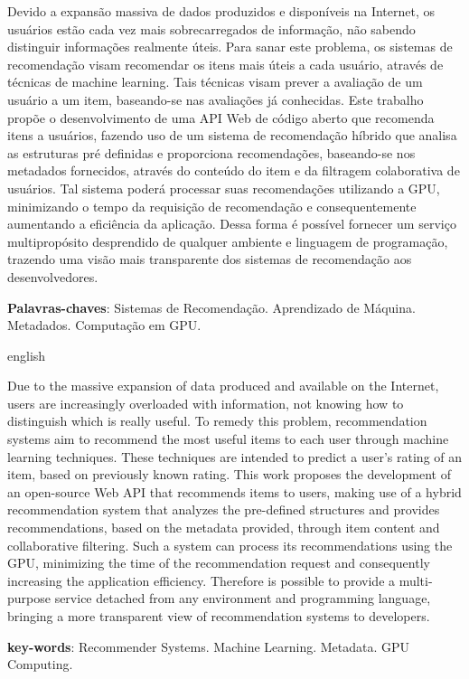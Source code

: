 \documentclass[12pt, openright, oneside, a4paper, brazil]{abntex2}
\begin{document}
\setlength{\absparsep}{18pt} %
\begin{resumo} 

Devido a expansão massiva de dados produzidos e disponíveis na Internet, os usuários estão cada vez mais sobrecarregados de informação, não sabendo distinguir informações realmente úteis. Para sanar este problema, os sistemas de recomendação visam recomendar os itens mais úteis a cada usuário, através de técnicas de machine learning. Tais técnicas visam prever a avaliação de um usuário a um item, baseando-se nas avaliações já conhecidas. Este trabalho propõe o desenvolvimento de uma API Web de código aberto que recomenda itens a usuários, fazendo uso de um sistema de recomendação híbrido que analisa as estruturas pré definidas e proporciona recomendações, baseando-se nos metadados fornecidos, através do conteúdo do item e da filtragem colaborativa de usuários. Tal sistema poderá processar suas recomendações utilizando a GPU, minimizando o tempo da requisição de recomendação e consequentemente aumentando a eficiência da aplicação. Dessa forma é possível fornecer um serviço multipropósito desprendido de qualquer ambiente e linguagem de programação, trazendo uma visão mais transparente dos sistemas de recomendação aos desenvolvedores.

\textbf{Palavras-chaves}: Sistemas de Recomendação. Aprendizado de Máquina. Metadados. Computação em GPU.
\end{resumo}

\begin{resumo}[Abstract]
 \begin{otherlanguage*}{english}

Due to the massive expansion of data produced and available on the Internet, users are increasingly overloaded with information, not knowing how to distinguish which is really useful. To remedy this problem, recommendation systems aim to recommend the most useful items to each user through machine learning techniques. These techniques are intended to predict a user's rating of an item, based on previously known rating. This work proposes the development of an open-source Web API that recommends items to users, making use of a hybrid recommendation system that analyzes the pre-defined structures and provides recommendations, based on the metadata provided, through item content and collaborative filtering. Such a system can process its recommendations using the GPU, minimizing the time of the recommendation request and consequently increasing the application efficiency. Therefore is possible to provide a multi-purpose service detached from any environment and programming language, bringing a more transparent view of recommendation systems to developers.

  \textbf{key-words}: Recommender Systems. Machine Learning. Metadata. GPU Computing.
 \end{otherlanguage*}
\end{resumo}
\end{document}
